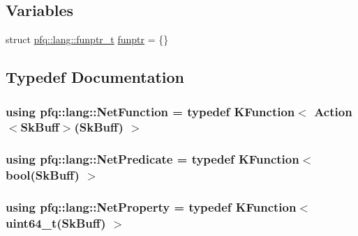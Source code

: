 \subsection*{Variables}
\begin{DoxyCompactItemize}
\item 
struct \hyperlink{structpfq_1_1lang_1_1funptr__t}{pfq\+::lang\+::funptr\+\_\+t} \hyperlink{namespacepfq_1_1lang_a8d957b8f6df7198413d3ff9bd698e682}{funptr} = \{\}
\end{DoxyCompactItemize}


\subsection{Typedef Documentation}
\subsubsection[{\texorpdfstring{Net\+Function}{NetFunction}}]{\setlength{\rightskip}{0pt plus 5cm}using {\bf pfq\+::lang\+::\+Net\+Function} = typedef {\bf K\+Function}$<$ {\bf Action}$<${\bf Sk\+Buff}$>$({\bf Sk\+Buff}) $>$}\hypertarget{namespacepfq_1_1lang_a683f79c96532eb04a9750215004f6da3}{}\label{namespacepfq_1_1lang_a683f79c96532eb04a9750215004f6da3}
\subsubsection[{\texorpdfstring{Net\+Predicate}{NetPredicate}}]{\setlength{\rightskip}{0pt plus 5cm}using {\bf pfq\+::lang\+::\+Net\+Predicate} = typedef {\bf K\+Function}$<$ bool({\bf Sk\+Buff}) $>$}\hypertarget{namespacepfq_1_1lang_ac239a78ab8b48b8248a19910fa06e25c}{}\label{namespacepfq_1_1lang_ac239a78ab8b48b8248a19910fa06e25c}
\subsubsection[{\texorpdfstring{Net\+Property}{NetProperty}}]{\setlength{\rightskip}{0pt plus 5cm}using {\bf pfq\+::lang\+::\+Net\+Property} = typedef {\bf K\+Function}$<$ uint64\+\_\+t({\bf Sk\+Buff}) $>$}\hypertarget{namespacepfq_1_1lang_a57429ebee2d34e07e521ffd16d714d89}{}\label{namespacepfq_1_1lang_a57429ebee2d34e07e521ffd16d714d89}


